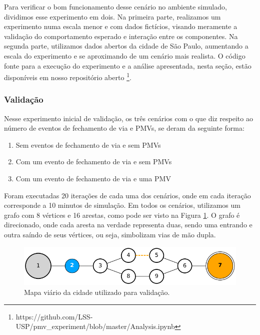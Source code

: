 Para verificar o bom funcionamento desse cenário no ambiente simulado, dividimos esse experimento em dois.
Na primeira parte, realizamos um experimento numa escala menor e com dados fictícios, visando meramente a validação do comportamento esperado e interação entre os componentes.
Na segunda parte, utilizamos dados abertos da cidade de São Paulo, aumentando a escala do experimento e se aproximando de um cenário mais realista.
O código fonte para a execução do experimento e a análise apresentada, nesta seção, estão disponíveis em nosso repositório aberto
\footnote{https://github.com/LSS-USP/pmv\_experiment/blob/master/Analysis.ipynb}.

\subsubsection{Validação}

Nesse experimento inicial de validação, os três cenários com o que diz respeito ao número de eventos de fechamento de via e PMVs, se deram da seguinte forma:

\begin{enumerate}
    \item Sem eventos de fechamento de via e sem PMVs

    \item Com um evento de fechamento de via e sem PMVs

    \item Com um evento de fechamento de via e uma PMV
\end{enumerate}

Foram executadas 20 iterações de cada uma dos cenários, onde em cada iteração corresponde a 10 minutos de simulação.
Em todos os cenários, utilizamos um grafo com 8 vértices e 16 arestas, como pode ser visto na Figura \ref{fig:mapa_validacao}.
O grafo é direcionado, onde cada aresta na verdade representa duas, sendo uma entrando e outra saíndo de seus vértices, ou seja, simbolizam vias de mão dupla.

\begin{figure}[ht]
	\centering
	\includegraphics[width=\textwidth]{figuras/mapa_validacao.png}
	\caption{Mapa viário da cidade utilizado para validação.}
	\label{fig:mapa_validacao}
\end{figure}

